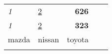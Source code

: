 \begin{table}[htbp]
\label{lab:tabela}
        \begin{tabular}{llrll}
            \cline{1-3}
            \multicolumn{1}{|l|}{\textit{1}} & \multicolumn{1}{l|}{{\ul 2}} & \multicolumn{1}{r|}{\textbf{626}} &  &  \\ \cline{1-3}
            \multicolumn{1}{|l|}{\textit{1}} & \multicolumn{1}{l|}{{\ul 2}} & \multicolumn{1}{r|}{\textbf{323}} &  &  \\ \cline{1-3}
            \multicolumn{1}{|c|}{mazda}      & \multicolumn{1}{c|}{nissan}  & \multicolumn{1}{c|}{toyota}       &  &  \\ \cline{1-3}
                                             &                              & \multicolumn{1}{l}{}              &  & 
        \end{tabular}
    \end{table}